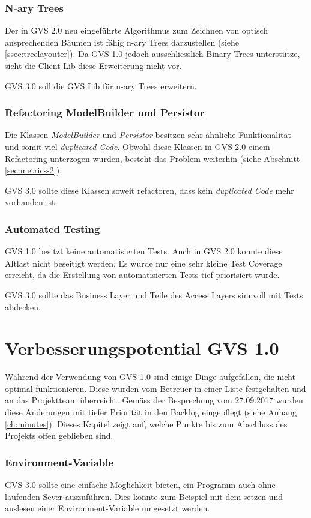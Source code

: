 \documentclass[11pt,a4paper,english,oneside]{book}
\numberwithin{equation}{chapter}
\begin{document}
	\subsubsection{N-ary Trees}
	Der in GVS 2.0 neu eingeführte Algorithmus zum Zeichnen von optisch ansprechenden Bäumen ist fähig n-ary Trees darzustellen (siehe \ref{ssec:treelayouter}). Da GVS 1.0 jedoch ausschliesslich Binary Trees unterstütze, sieht die Client Lib diese Erweiterung nicht vor.
	
	GVS 3.0 soll die GVS Lib für n-ary Trees erweitern.
	
	\subsubsection{Refactoring ModelBuilder und Persistor}
	Die Klassen \textit{ModelBuilder} und \textit{Persistor} besitzen sehr ähnliche Funktionalität und somit viel \textit{duplicated Code}. Obwohl diese Klassen in GVS 2.0 einem Refactoring unterzogen wurden, besteht das Problem weiterhin (siehe Abschnitt \ref{sec:metrics-2}).
	
	GVS 3.0 sollte diese Klassen soweit refactoren, dass kein \textit{duplicated Code} mehr vorhanden ist.
	
	\subsubsection{Automated Testing}
	GVS 1.0 besitzt keine automatisierten Tests. Auch in GVS 2.0 konnte diese Altlast nicht beseitigt werden. Es wurde nur eine sehr kleine Test Coverage erreicht, da die Erstellung von automatisierten Tests tief priorisiert wurde.
	
	GVS 3.0 sollte das Business Layer und Teile des Access Layers sinnvoll mit Tests abdecken.
	
	\section{Verbesserungspotential GVS 1.0}
	Während der Verwendung von GVS 1.0 sind einige Dinge aufgefallen, die nicht optimal funktionieren. Diese wurden vom Betreuer in einer Liste festgehalten und an das Projektteam überreicht. Gemäss der Besprechung vom 27.09.2017 wurden diese Änderungen mit tiefer Priorität in den Backlog eingepflegt (siehe Anhang \ref{ch:minutes}). Dieses Kapitel zeigt auf, welche Punkte bis zum Abschluss des Projekts offen geblieben sind.
	
	\subsubsection{Environment-Variable}
	GVS 3.0 sollte eine einfache Möglichkeit bieten, ein Programm auch ohne laufenden Sever auszuführen. Dies könnte zum Beispiel mit dem setzen und auslesen einer Environment-Variable umgesetzt werden.
	
\end{document}

